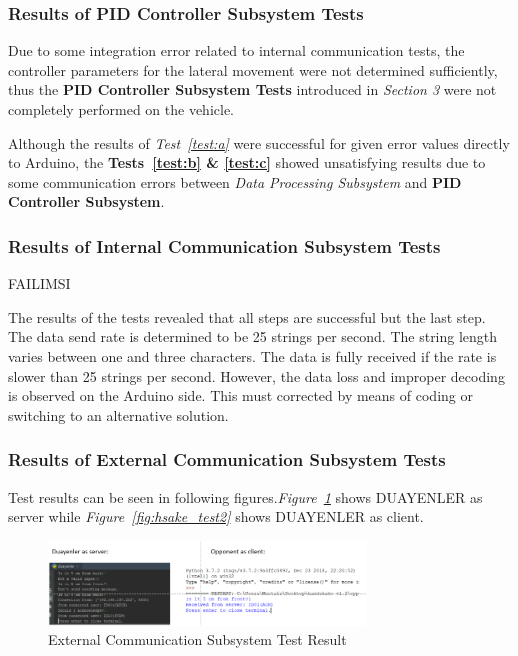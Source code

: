 \documentclass[a4paper,12pt]{article}
\begin{document}
		
	\subsubsection*{Results of PID Controller Subsystem Tests}
	
	Due to some integration error related to internal communication tests, the controller parameters for the lateral movement were not determined sufficiently, thus the \textbf{PID Controller Subsystem Tests} introduced in \textit{Section 3} were not completely performed on the vehicle. 
	
	Although the results of \textit{Test~\ref{test:a}} were successful for given error values directly to Arduino, the \textbf{Tests~\ref{test:b} \& \ref{test:c}} showed unsatisfying results due to some communication errors between \textit{Data Processing Subsystem} and \textbf{PID Controller Subsystem}.
	
	
	\subsubsection*{Results of Internal Communication Subsystem Tests}
	
	
	 FAILIMSI
	
	
	The results of the tests revealed that all steps are successful but the last step. The data send rate is determined to be 25 strings per second. The string length varies between one and three characters. The data is fully received if the rate is slower than 25 strings per second. However, the data loss  and  improper decoding is observed on the Arduino side. This must corrected by means of coding or switching to an alternative solution.
	

	
	
	
		

	\subsubsection*{Results of External Communication Subsystem Tests}
	

	 Test results can be seen in following figures.\textit{Figure~\ref{fig:hsake_test1}} shows DUAYENLER as server while \textit{Figure~\ref{fig:hsake_test2}} shows DUAYENLER as client.
	
	\begin{figure}[h]
		\includegraphics[width=0.75\textwidth,center]{images/hsake1}
		\caption{External Communication Subsystem Test Result \label{fig:hsake_test1} }
	\end{figure}
	
\end{document}
